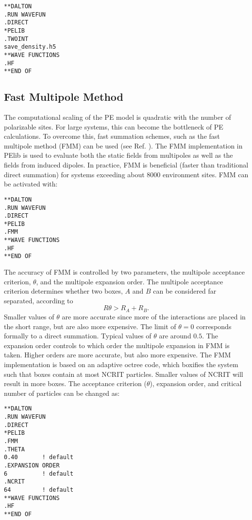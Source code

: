 \begin{verbatim}
**DALTON
.RUN WAVEFUN
.DIRECT
*PELIB
.TWOINT
save_density.h5
**WAVE FUNCTIONS
.HF
**END OF
\end{verbatim}


\subsection{Fast Multipole Method}\label{subsec:FMM}
The computational scaling of the PE model is quadratic with the number of polarizable sites.
For large systems, this can become the bottleneck of PE calculations.
To overcome this, fast summation schemes, such as the fast multipole method (FMM) can be used (see Ref. ).
The FMM implementation in PElib is used to evaluate both the static fields from multipoles as well 
as the fields from induced dipoles.
In practice, FMM is beneficial (faster than traditional direct summation) for systems exceeding 
about 8000 environment sites. 
FMM can be activated with:

\begin{verbatim}
**DALTON
.RUN WAVEFUN
.DIRECT
*PELIB
.FMM
**WAVE FUNCTIONS
.HF
**END OF
\end{verbatim}

The accuracy of FMM is controlled by two parameters, the multipole acceptance criterion, $\theta$,
and the multipole expansion order. The multipole acceptance criterion determines whether two 
boxes, $A$ and $B$ can be considered far separated, according to
\begin{equation}
R\theta > R_A + R_B.
\end{equation}
Smaller values of $\theta$ are more accurate since more of the interactions are placed in the 
short range, but are also more expensive. The limit of $\theta=0$ corresponds formally to a 
direct summation. Typical values of $\theta$ are around $0.5$.
The expansion order controls to which order the multipole expansion in FMM is taken. 
Higher orders are more accurate, but also more expensive.
The FMM implementation is based on an adaptive octree code, which boxifies the system such that
boxes contain at most NCRIT particles. Smaller values of NCRIT will result in more boxes.
The acceptance criterion ($\theta$), expansion order, and critical number of particles can be changed as:

\begin{verbatim}
**DALTON
.RUN WAVEFUN
.DIRECT
*PELIB
.FMM
.THETA
0.40       ! default
.EXPANSION ORDER
6          ! default
.NCRIT
64         ! default
**WAVE FUNCTIONS
.HF
**END OF
\end{verbatim}

